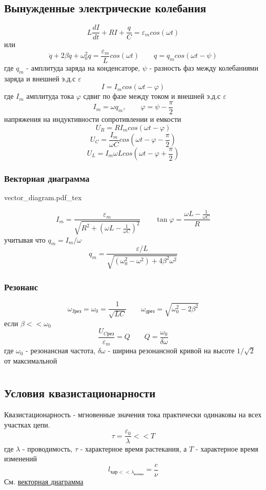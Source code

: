 \documentclass{article}
\newcommand{\incfig}[2][1]{%
    \def\svgwidth{#1\columnwidth}
    {#2.pdf_tex}
}
\begin{document}
\subsection{Вынужденные электрические колебания}
\[L\frac{dI}{dt} + RI + \frac{q}{C} = \varepsilon_m cos(\omega t)\]
или
\[\ddot{q} + 2\beta\dot{q} + \omega_0^2 q = \frac{\varepsilon_m}{L} cos(\omega t) \qquad q = q_m cos(\omega t - \psi)\]
где $q_m$ - амплитуда заряда на конденсаторе, $\psi$ - разность фаз между колебаниями заряда и внешней э.д.с $\varepsilon$
\[I = I_m cos (\omega t - \varphi)\]
где $I_m$ амплитуда тока $\varphi$ сдвиг по фазе между током и внешней э.д.с $\varepsilon$
\[I_m = \omega q_m, \qquad \varphi = \psi - \frac{\pi}{2}\]
напряжения на индуктивности сопротивлении и емкости
\[U_R = RI_mcos(\omega t - \varphi)\]
\[U_C = \frac{I_m}{\omega C} cos(\omega t - \varphi - \frac{\pi}{2})\]
\[U_L = {I_m\omega L} cos(\omega t - \varphi + \frac{\pi}{2})\]
\subsubsection{Векторная диаграмма} \label{sec:vecdiag}
\incfig{vector_diagram}
\[I_m = \frac{\varepsilon_m}{\sqrt{R^2 + (\omega L - \frac{1}{\omega C})^2}} \qquad \tan \varphi = \frac{\omega L - \frac{1}{\omega C}}{R}\]
учитывая что $q_m=I_m/\omega$
\[q_m=\frac{\varepsilon/L}{\sqrt{(\omega_0^2-\omega^2)+4\beta^2\omega^2}}\]
\subsubsection{Резонанс} \label{sec:resonance}
\[\omega_{I\text{рез}} = \omega_0 = \frac{1}{\sqrt{LC}} \qquad \omega_{q\text{рез}} = \sqrt{\omega_0^2 - 2\beta^2}\]
если $\beta << \omega_0$
\[\frac{U_{C\text{рез}}}{\varepsilon_m} = Q \qquad Q = \frac{\omega_0}{\delta \omega}\]
где $\omega_0$ - резонансная частота, $\delta \omega$ - ширина резонансной кривой на высоте $1/\sqrt{2}$ от максимальной


\section{}
\subsection{Условия квазистационарности}
Квазистационарность - мгновенные значения тока практически одинаковы на всех участках цепи.
\[\tau=\frac{\varepsilon_0}{\lambda} << T\]
где $\lambda$ - проводимость, $\tau$ - характерное время растекания, а $T$ - характерное время изменений
\[l_{\text{хар}<<\lambda_{\text{волны}}}=\frac{c}{\nu}\]
См. \hyperref[sec:vecdiag]{векторная диаграмма}
\end{document}

